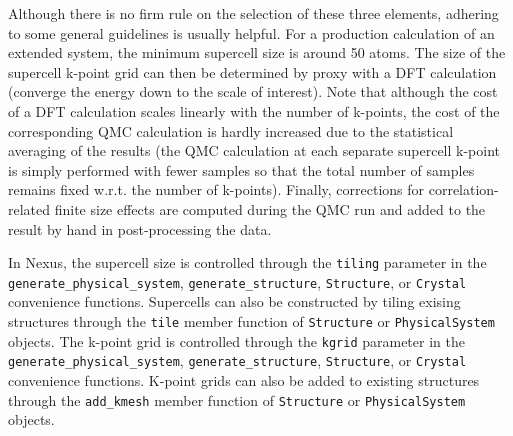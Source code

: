 \documentclass[oneside,11pt]{memoir}
\numberwithin{equation}{section}
\begin{document}
Although there is no firm rule on the selection of these three elements, 
adhering to some general guidelines is usually helpful.  For a production 
calculation of an extended system, the minimum supercell size is around 50 
atoms.  The size of the supercell k-point grid can then be determined by 
proxy with a DFT calculation (converge the energy down to the scale of 
interest).  Note that although the cost of a DFT calculation scales linearly 
with the number of k-points, the cost of the corresponding QMC calculation 
is hardly increased due to the statistical averaging of the results 
(the QMC calculation at each separate supercell k-point is simply performed 
with fewer samples so that the total number of samples remains fixed w.r.t. 
the number of k-points).  Finally, corrections for correlation-related 
finite size effects are computed during the QMC run and added to the result 
by hand in post-processing the data.

In Nexus, the supercell size is controlled through the 
\texttt{tiling} parameter in the \texttt{generate\_physical\_system}, 
\texttt{generate\_structure}, \texttt{Structure}, or \texttt{Crystal} 
convenience functions.  Supercells can also be constructed by tiling exising 
structures through the \texttt{tile} member function of \texttt{Structure} or 
\texttt{PhysicalSystem} objects.  The k-point grid is controlled through the 
\texttt{kgrid} parameter in the 
\texttt{generate\_physical\_system}, 
\texttt{generate\_structure}, \texttt{Structure}, or \texttt{Crystal} 
convenience functions.  K-point grids can also be added to existing structures 
through the \texttt{add\_kmesh} member function of \texttt{Structure} or 
\texttt{PhysicalSystem} objects.
\end{document}
